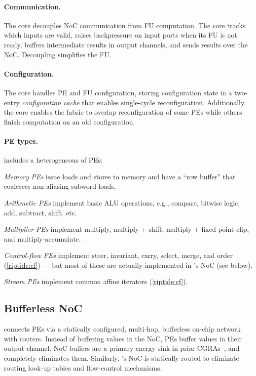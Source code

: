 \paragraph{Communication.}
The \textmu core decouples NoC communication from FU computation.
% 
The \textmu core tracks which inputs are valid, raises backpressure on
input ports when its FU is not ready, buffers intermediate results in
output channels, and sends results over the NoC.
%
Decoupling simplifies the FU.

\paragraph{Configuration.}
The \textmu core handles PE and FU configuration, storing configuration state in a
two-entry {\em configuration cache} that enables single-cycle reconfiguration. 
% 
Additionally, the \textmu core enables the fabric to overlap
reconfiguration of some PEs while others
finish computation on an old configuration.

\paragraph{PE types.}
\riptide includes a heterogeneous of PEs:
\begin{compactitem}
\item \emph{Memory PEs} issue loads and stores to memory and have a ``row buffer'' that coalesces non-aliasing subword loads.

\item \emph{Arithmetic PEs} implement basic ALU operations, e.g., compare, bitwise logic, add, subtract, shift, etc.

\item \emph{Multiplier PEs} implement multiply, multiply + shift, multiply + fixed-point clip, and multiply-accumulate.

\item \emph{Control-flow PEs} implement steer, invariant, carry, select, merge, and order (\autoref{riptide:cf}) ---
%
but most of these are actually implemented in \riptide's NoC (see below).

\item \emph{Stream PEs} implement common affine iterators (\autoref{riptide:cf}).
\end{compactitem}

\figRipTideMicroArch

\subsection{Bufferless NoC}

\riptide connects PEs via a statically configured, multi-hop, bufferless
on-chip network with routers.
%
Instead of buffering values in the NoC,
PEs buffer values in their output channel.
%
NoC buffers are a primary energy sink in prior CGRAs~\cite{karunaratne2017hycube,snafu},
and \riptide completely eliminates them.
%
Similarly, \riptide's NoC is statically routed to eliminate routing
look-up tables and flow-control mechanisms.
% 